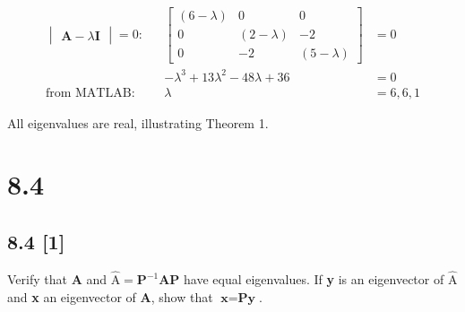 \documentclass{article}
\begin{document}
\begin{align}
    \label{eq:3}
    \begin{vmatrix}
    \textbf{A} - \lambda\textbf{I}
    \end{vmatrix} = 0: && \begin{bmatrix}
    (6-\lambda) & 0 & 0\\
    0 & (2-\lambda) & -2\\
    0 & -2 & (5-\lambda)
    \end{bmatrix} &= 0
    \\
    \label{eq:4}
    && -\lambda^3 + 13\lambda^2 -48\lambda + 36 &= 0
    \\
    \label{eq:5}
    \text{from MATLAB}: && \lambda &= 6, 6, 1
\end{align}

All eigenvalues are real, illustrating Theorem 1.

\newpage

\section*{8.4}
\setcounter{equation}{0}

\subsection*{8.4 [1]}
\setcounter{equation}{0}

Verify that \textbf{A} and \textbf{$\hat{\text{A}} = \textbf{P}^{-1} \textbf{A} \textbf{P}$} have equal eigenvalues.  If \textbf{y} is an eigenvector of \textbf{$\hat{\text{A}}$} and \textbf{x} an eigenvector of \textbf{A}, show that $\textbf{x}=\textbf{Py}$.
\end{document}

